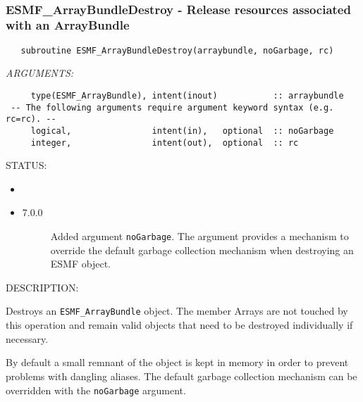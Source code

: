  
\mbox{}\hrulefill\ 
 
\subsubsection [ESMF\_ArrayBundleDestroy] {ESMF\_ArrayBundleDestroy - Release resources associated with an ArrayBundle}


 
\begin{verbatim}   subroutine ESMF_ArrayBundleDestroy(arraybundle, noGarbage, rc)\end{verbatim}{\em ARGUMENTS:}
\begin{verbatim}     type(ESMF_ArrayBundle), intent(inout)           :: arraybundle
 -- The following arguments require argument keyword syntax (e.g. rc=rc). --
     logical,                intent(in),   optional  :: noGarbage
     integer,                intent(out),  optional  :: rc
           \end{verbatim}
{\sf STATUS:}
   \begin{itemize}
   \item{}
   \item{}
   \begin{description}
   \item[7.0.0] Added argument {\tt noGarbage}.
     The argument provides a mechanism to override the default garbage collection
     mechanism when destroying an ESMF object.
   \end{description}
   \end{itemize}
  
{\sf DESCRIPTION:\\ }


     Destroys an {\tt ESMF\_ArrayBundle} object. The member Arrays are not
     touched by this operation and remain valid objects that need to be 
     destroyed individually if necessary. 
  
     By default a small remnant of the object is kept in memory in order to 
     prevent problems with dangling aliases. The default garbage collection
     mechanism can be overridden with the {\tt noGarbage} argument.
  
